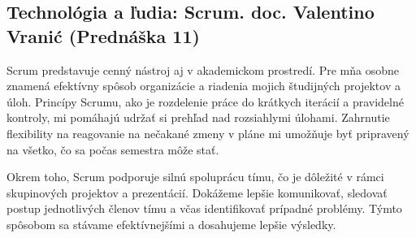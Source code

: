 \documentclass[12pt,twoside,slovak,a4paper]{article}
\begin{document}
\subsection{Technológia a ľudia: Scrum. doc. Valentino Vranić (Prednáška 11)}
Scrum predstavuje cenný nástroj aj v akademickom prostredí. Pre mňa osobne znamená efektívny spôsob organizácie a riadenia mojich študijných projektov a úloh. Princípy Scrumu, ako je rozdelenie práce do krátkych iterácií a pravidelné kontroly, mi pomáhajú udržať si prehľad nad rozsiahlymi úlohami. Zahrnutie flexibility na reagovanie na nečakané zmeny v pláne mi umožňuje byť pripravený na všetko, čo sa počas semestra môže stať.

Okrem toho, Scrum podporuje silnú spoluprácu tímu, čo je dôležité v rámci skupinových projektov a prezentácií. Dokážeme lepšie komunikovať, sledovať postup jednotlivých členov tímu a včas identifikovať prípadné problémy. Týmto spôsobom sa stávame efektívnejšími a dosahujeme lepšie výsledky.




%
%
%





\nocite{10057722}
\nocite{7087040}
\nocite{7783248}
\nocite{7809906}
\nocite{8250692}
\nocite{8575882}
\nocite{9325452}
\nocite{9719080}
\nocite{9952138}
\nocite{9952143}
\nocite{1250902}
\nocite{6616536}




\end{document}
